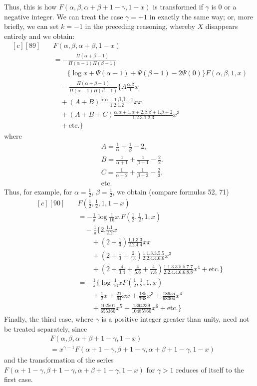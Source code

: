 Thus, this is how $F(\alpha,\beta,\alpha+\beta+1-\gamma,1-x)$ is transformed if $\gamma$ is $0$ or a negative integer. We can treat the case $\gamma=+1$ in exactly the same way; or, more briefly, we can set $k=-1$ in the preceding reasoning, whereby $X$ disappears entirely and we obtain:
\[
\begin{aligned}[c]
[89]\quad &F(\alpha,\beta,\alpha+\beta,1-x)\\
&=-\frac{\Pi(\alpha+\beta-1)}{\Pi(\alpha-1)\Pi(\beta-1)}
\\&\qquad\{\log x+\Psi(\alpha-1)+\Psi(\beta-1)-2\Psi(0)\}F(\alpha,\beta,1,x)\\
&\quad-\frac{\Pi(\alpha+\beta-1)}{\Pi(\alpha-1)\Pi(\beta-1)}
\{A\frac{\alpha.\beta}{1}x\\
&\quad+(A+B)\frac{\alpha.\alpha+1.\beta.\beta+1}{1.2.1.2}xx\\
&\quad+(A+B+C)\frac{\alpha.\alpha+1.\alpha+2.\beta.\beta+1.\beta+2}{1.2.3.1.2.3}x^3\\
&\quad+\text{etc.}\}
\end{aligned}
\]
where
\[
\begin{aligned}&A=\frac1\alpha+\frac1\beta-2,\\&
B=\frac1{\alpha+1}+\frac1{\beta+1}-\frac22.\\&
C=\frac1{\alpha+2}+\frac1{\beta+2}-\frac23,\\&\text{etc.}\end{aligned}
\]
Thus, for example, for $\alpha=\frac12$, $\beta=\frac12$, we obtain (compare formulas 52, 71)
\[
\begin{aligned}[c]
[90]\quad &F(\tfrac12,\tfrac12,1,1-x)\\
&=-\frac1\pi\log\tfrac1{16}x. F(\tfrac12,\tfrac12,1,x)\\
&\quad-\frac1\pi\{2.\frac{1.1}{2.2}x
\\&\qquad+(2+\tfrac13)\frac{1.1.3.3}{2.2.4.4}xx
\\&\qquad+(2+\tfrac13+\tfrac2{15})\frac{1.1.3.3.5.5}{2.2.4.4.6.6}x^3\\
&\qquad+(2+\tfrac4{3.4}+\tfrac4{5.6}+\tfrac4{7.8})
\frac{1.1.3.3.5.5.7.7}{2.2.4.4.6.6.8.8}x^4+\text{etc.}\}\\
&=-\frac1\pi\{\log\tfrac1{16}xF(\tfrac12,\tfrac12,1,x)
\\&\qquad+\tfrac12x+\tfrac{21}{64}xx+\tfrac{185}{768}x^3+\tfrac{18655}{98304}x^4\\
&\qquad+\tfrac{102501}{655360}x^5+\tfrac{1394239}{10485760}x^6+\text{etc.}\}
\end{aligned}
\]
Finally, the third case, where $\gamma$ is a positive integer greater than unity, need not be treated separately, since
\[
\begin{aligned}&F(\alpha,\beta,\alpha+\beta+1-\gamma,1-x)\\&=x^{\gamma-1}F(\alpha+1-\gamma,\beta+1-\gamma,\alpha+\beta+1-\gamma,1-x)\end{aligned}
\]
and the transformation of the series $F(\alpha+1-\gamma,\beta+1-\gamma,\alpha+\beta+1-\gamma,1-x)$ for $\gamma>1$ reduces of itself to the first case.


